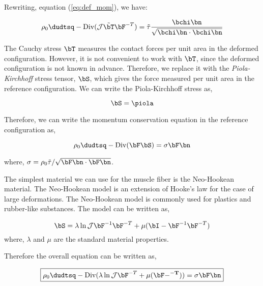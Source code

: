 Rewriting, equation (\ref{eq:def_mom}), we have:

\begin{equation}
\rho_0 \dudtsq - \mbox{Div} (\mathcal{J}\tilde{\bT}\bF^{-T}) = \tilde{\tau} \frac{\bchi\bn}{\sqrt{\bchi\bn\cdot\bchi\bn}} 
\end{equation}

The Cauchy stress $\bT$ measures the contact forces per unit area in the deformed configuration. However, it is not convenient to work with $\bT$, since the deformed configuration is not known in advance. Therefore, we replace it with the {\em Piola-Kirchhoff} stress tensor, $\bS$, which gives the force measured per unit area in the reference configuration. We can write the Piola-Kirchhoff stress as,

\[
\bS = \piola
\]

Therefore, we can write the momentum conservation equation in the reference configuration as,

\begin{equation}
\rho_0\dudtsq - \mbox{Div}(\bF \bS) = \sigma\bF\bn
\end{equation}

where, $\sigma = \rho_0\tilde{\tau}/\sqrt{\bF\bn\cdot\bF\bn}$.


The simplest material we can use for the muscle fiber is the Neo-Hookean material. The Neo-Hookean model is an extension of Hooke's law for the case of large deformations. The Neo-Hookean model is commonly used for plastics and rubber-like substances. The model can be written as,

\[
\bS = \lambda \ln \mathcal{J} \bF^{-1}\bF^{-T}  + \mu(\bI - \bF^{-1}\bF^{-T} )
\]
where, $\lambda$ and $\mu$ are the standard material properties.

Therefore the overall equation can be written as,


\begin{equation}
\label{eq:model}
\boxed {
\rho_0\dudtsq - \mbox{Div}(\lambda \ln\mathcal{J}\bF^{-T} + \mu(\bF -\bf^{-T})) = \sigma\bF\bn}
\end{equation}
